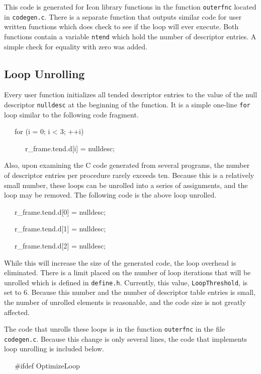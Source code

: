 This code is generated for Icon library functions in the function
\texttt{outerfnc} located in \texttt{codegen.c}. There is a separate
function that outputs similar code for user written functions which
does check to see if the loop will ever execute. Both functions
contain a variable \texttt{ntend} which hold the number of descriptor
entries. A simple check for equality with zero was added.

\subsection{Loop Unrolling}

Every user function initializes all tended descriptor entries to the
value of the null descriptor \texttt{nulldesc} at the beginning of the
function. It is a simple one-line \texttt{for} loop similar to the
following code fragment.

{\ttfamily\mdseries
\ \ \ for (i = 0; i {\textless} 3; ++i)}

{\ttfamily\mdseries
\ \ \ \ \ \ r\_frame.tend.d[i] = nulldesc;}


Also, upon examining the C code generated from several programs, the
number of descriptor entries per procedure rarely exceeds ten. Because
this is a relatively small number, these loops can be unrolled into a
series of assignments, and the loop may be removed. The following code
is the above loop unrolled.

{\ttfamily\mdseries
\ \ \ r\_frame.tend.d[0] = nulldesc;}

{\ttfamily\mdseries
\ \ \ r\_frame.tend.d[1] = nulldesc;}

{\ttfamily\mdseries
\ \ \ r\_frame.tend.d[2] = nulldesc;}


While this will increase the size of the generated code, the loop
overhead is eliminated. There is a limit placed on the number of loop
iterations that will be unrolled which is defined in
\texttt{define.h}. Currently, this value, \texttt{LoopThreshold}, is
set to 6. Because this number and the number of descriptor table
entries is small, the number of unrolled elements is reasonable, and
the code size is not greatly affected.


The code that unrolls these loops is in the function \texttt{outerfnc}
in the file \texttt{codegen.c}. Because this change is only several
lines, the code that implements loop unrolling is included below.

{\ttfamily\mdseries
\ \ \ \#ifdef OptimizeLoop}

